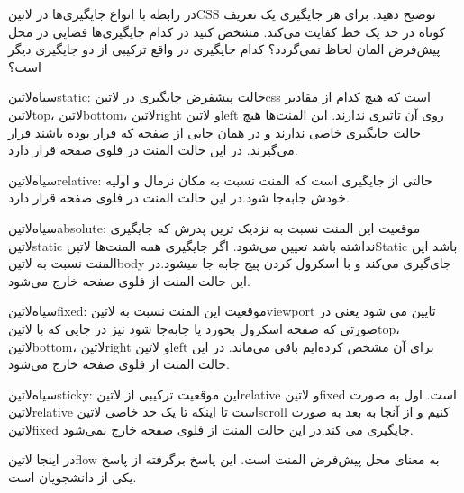 
در رابطه با انواع جایگیری‌ها در ‌لاتین{CSS} توضیح دهید. برای هر جایگیری یک تعریف کوتاه در حد یک خط کفایت می‌کند. مشخص کنید در کدام
جایگیری‌ها فضایی در محل پیش‌فرض المان لحاظ نمی‌گردد؟ کدام جایگیری در واقع ترکیبی از دو جایگیری دیگر است؟




 ‌سیاه{‌لاتین{static}}:
حالت پیشفرض جایگیری در ‌لاتین{css} است که هیچ کدام از مقادیر
‌لاتین{top}، ‌لاتین{bottom}، ‌لاتین{right} و ‌لاتین{left} روی آن تاثیری ندارند.
این المنت‌ها هیچ حالت جایگیری خاصی ندارند و در همان جایی از صفحه که قرار بوده باشند قرار می‌گیرند. در این
حالت المنت در فلوی صفحه قرار دارد.

 ‌سیاه{‌لاتین{relative}}:
حالتی از جایگیری است که المنت نسبت به مکان نرمال و اولیه خودش جابه‌جا شود.در این حالت المنت در فلوی
صفحه قرار دارد.

 ‌سیاه{‌لاتین{absolute}}:
موقعیت این المنت نسبت به نزدیک ترین پدرش که جایگیری ‌لاتین{static} نداشته باشد تعیین می‌شود.
اگر جایگیری همه
المنت‌ها ‌لاتین{Static} باشد این المنت نسبت به ‌لاتین{body} جای‌گیری می‌کند
و با اسکرول کردن پیج جابه جا میشود.در این
حالت المنت از فلوی صفحه خارج می‌شود.

 ‌سیاه{‌لاتین{fixed}}:
موقعیت این المنت نسبت به ‌لاتین{viewport} تایین می شود یعنی در صورتی که صفحه اسکرول بخورد یا جابه‌جا شود نیز
در جایی که با
‌لاتین{top}،
‌لاتین{bottom}،
‌لاتین{right} و
‌لاتین{left}
برای آن مشخص کرده‌ایم باقی می‌ماند. در این حالت المنت از فلوی صفحه
خارج می‌شود.

 ‌سیاه{‌لاتین{sticky}}:
این موقعیت ترکیبی از ‌لاتین{relative} و ‌لاتین{fixed} است. اول به صورت ‌لاتین{relative} است تا اینکه تا یک حد خاصی ‌لاتین{scroll} کنیم
و از آنجا به بعد به صورت ‌لاتین{fixed} جایگیری می کند.در این حالت المنت از فلوی صفحه خارج نمی‌شود.


در اینجا ‌لاتین{flow} به معنای محل پیش‌فرض المنت است. این پاسخ برگرفته از پاسخ یکی از دانشجویان است.

